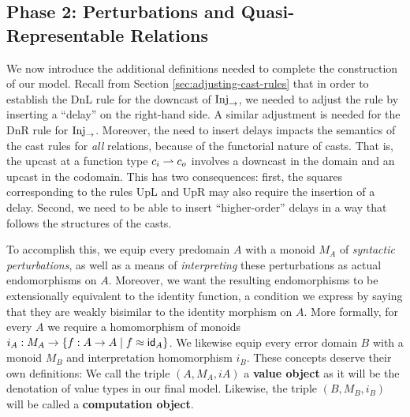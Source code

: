 

\subsection{Phase 2: Perturbations and Quasi-Representable Relations}

We now introduce the additional definitions needed to complete the construction
of our model. Recall from Section \ref{sec:adjusting-cast-rules} that in order
to establish the DnL rule for the downcast of $\text{Inj}_\to$, we needed to adjust the
rule by inserting a ``delay'' on the right-hand side. A similar adjustment is
needed for the DnR rule for $\text{Inj}_\to$. Moreover, the need to insert delays impacts
the semantics of the cast rules for \emph{all} relations, because of the
functorial nature of casts. That is, the upcast at a function type $c_i \rightharpoonup c_o$
involves a downcast in the domain and an upcast in the codomain. This has two
consequences: first, the squares corresponding to the rules UpL and UpR may
also require the insertion of a delay. Second, we need to be able to insert
``higher-order'' delays in a way that follows the structures of the casts.


To accomplish this, we equip every predomain $A$ with a monoid $M_A$ of
\emph{syntactic perturbations}, as well as a means of \emph{interpreting} these
perturbations as actual endomorphisms on $A$. Moreover, we want the resulting
endomorphisms to be extensionally equivalent to the identity function, a
condition we express by saying that they are weakly bisimilar to the identity
morphism on $A$. More formally, for every $A$ we require a homomorphism of
monoids $i_A : M_A \to \{ f : A \to A \mid f \approx \mathsf{id}_A \}$. We likewise equip
every error domain $B$ with a monoid $M_B$ and interpretation homomorphism
$i_B$. These concepts deserve their own definitions: We call the triple $(A,
M_A, iA)$ a \textbf{value object} as it will be the denotation of value types in
our final model. Likewise, the triple $(B, M_B, i_B)$ will be called a
\textbf{computation object}.

